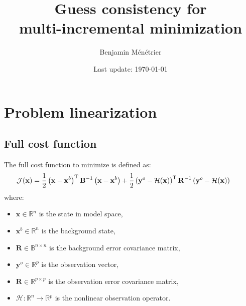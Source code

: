 \documentclass[12pt]{scrartcl}
\begin{document}
\title{\vspace{-1.2cm}Guess consistency for\\
multi-incremental minimization}
\author{Benjamin Ménétrier}
\date{Last update: \today\vspace{-0.5cm}}

\thispagestyle{empty}

\maketitle

\tableofcontents

\section{Problem linearization}

\subsection{Full cost function}
The full cost function to minimize is defined as:
\begin{align}
\hspace{-0.7cm} \mathcal{J}(\mathbf{x}) = \frac{1}{2} \left(\mathbf{x}-\mathbf{x}^b\right)^\mathrm{T} \mathbf{B}^{-1} \left(\mathbf{x}-\mathbf{x}^b\right) + \frac{1}{2} \left(\mathbf{y}^o-\mathcal{H}(\mathbf{x})\right)^\mathrm{T} \mathbf{R}^{-1} \left(\mathbf{y}^o-\mathcal{H}(\mathbf{x})\right)
\end{align}
where:
\begin{itemize}
\item $\mathbf{x} \in \mathbb{R}^n$ is the state in model space,
\item $\mathbf{x}^b \in \mathbb{R}^n$ is the background state,
\item $\mathbf{R} \in \mathbb{B}^{n \times n}$ is the background error covariance matrix,
\item $\mathbf{y}^o \in \mathbb{R}^p$ is the observation vector,
\item $\mathbf{R} \in \mathbb{R}^{p \times p}$ is the observation error covariance matrix,
\item $\mathcal{H} : \mathbb{R}^n \rightarrow \mathbb{R}^p$ is the nonlinear observation operator.
\end{itemize}
\end{document}
